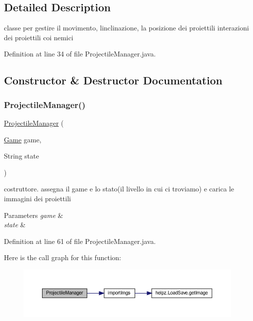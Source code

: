 \subsection{Detailed Description}
classe per gestire il movimento, l\textquotesingle{}inclinazione, la posizione dei proiettili interazioni dei proiettili coi nemici 

Definition at line 34 of file Projectile\+Manager.\+java.



\subsection{Constructor \& Destructor Documentation}
\mbox{\label{classmanagers_1_1_projectile_manager_a8959cc2d690b9ea6bf95b0b029352d50}} 
\subsubsection{\texorpdfstring{Projectile\+Manager()}{ProjectileManager()}}
{\footnotesize\ttfamily \hyperlink{classmanagers_1_1_projectile_manager}{Projectile\+Manager} (\begin{DoxyParamCaption}\item[{\hyperlink{classprogetto_1_1_game}{Game}}]{game,  }\item[{String}]{state }\end{DoxyParamCaption})}



costruttore. assegna il game e lo stato(il livello in cui ci troviamo) e carica le immagini dei proiettili 


\begin{DoxyParams}{Parameters}
{\em game} & \\
\hline
{\em state} & \\
\hline
\end{DoxyParams}


Definition at line 61 of file Projectile\+Manager.\+java.

Here is the call graph for this function\+:\nopagebreak
\begin{figure}[H]
\begin{center}
\leavevmode
\includegraphics[width=350pt]{classmanagers_1_1_projectile_manager_a8959cc2d690b9ea6bf95b0b029352d50_cgraph}
\end{center}
\end{figure}


